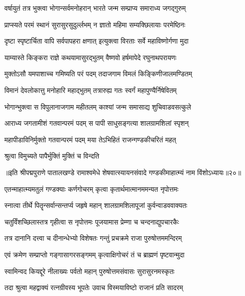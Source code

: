 \twolineshloka
{वर्षायुतं तत्र भुक्त्वा भोगान्सर्वमनोहरान्}
{भारते जन्म सम्प्राप्य समाराध्य जगद्गुरुम्}%

\twolineshloka
{प्राप्स्यते परमं स्थानं सुरासुरसुदुर्ल्लभम्}
{न ज्ञातो महिमा सम्यक्छिलायाः परमेष्ठिनः}%

\twolineshloka
{दृष्टा स्पृष्टार्चिता वापि सर्वपापहरा क्षणात्}
{इत्युक्त्वा विरताः सर्वे महाविष्णोर्गणा मुदा}%

\twolineshloka
{याम्यास्ते किङ्करा राज्ञे कथयामासुरद्भुतम्}
{वैष्णवो हर्षमापेदे रघुनाथपरायणः}%

\twolineshloka
{मुक्तोऽसौ यमपाशाच्च गमिष्यति परं पदम्}
{तदाजगाम विमलं किङ्किणीजालमण्डितम्}%

\twolineshloka
{विमानं देवलोकात्तु मनोहारि महाद्भुतम्}
{तत्रारुह्य गतः स्वर्गं महापुण्यैर्निषेवितम्}%

\twolineshloka
{भोगान्भुक्त्वा स विपुलानाजगाम महीतलम्}
{काश्यां जन्म समासाद्य शुचिवाडवसत्कुले}%

\twolineshloka
{आराध्य जगतामीशं गतवान्परमं पदम्}
{स पापी साधुसङ्गत्या शालग्रामशिलां स्पृशन्}%

\twolineshloka
{महापीडाविनिर्मुक्तो गतवान्परमं पदम्}
{मया तेऽभिहितं राजन्गण्डकीचरितं महत्}%

\onelineshloka
{श्रुत्वा विमुच्यते पापैर्भुक्तिं मुक्तिं च विन्दति}%

{॥इति श्रीपद्मपुराणे पातालखण्डे रामाश्वमेधे शेषवात्स्यायनसंवादे गण्डकीमाहात्म्यं नाम विंशोऽध्यायः॥२०॥}



\twolineshloka
{एतन्माहात्म्यमतुलं गण्डक्याः कर्णगोचरम्}
{कृत्वा कृतार्थमात्मानममन्यत नृपोत्तमः}%

\twolineshloka
{स्नात्वा तीर्थे पितॄन्सर्वान्सन्तर्प्य जहृषे महान्}
{शालग्रामशिलापूजां कुर्वन्वाडववाक्यतः}%

\twolineshloka
{चतुर्विंशच्छिलास्तत्र गृहीत्वा स नृपोत्तमः}
{पूजयामास प्रेम्णा च चन्दनाद्युपचारकैः}%

\twolineshloka
{तत्र दानानि दत्त्वा च दीनान्धेभ्यो विशेषतः}
{गन्तुं प्रचक्रमे राजा पुरुषोत्तममन्दिरम्}%

\twolineshloka
{एवं क्रमेण सम्प्राप्तो गङ्गासागरसङ्गमम्}
{कृत्वाक्षिगोचरं तं च ब्राह्मणं पृष्टवान्मुदा}%

\twolineshloka
{स्वामिन्वद कियद्दूरे नीलाख्यः पर्वतो महान्}
{पुरुषोत्तमसंवासः सुरासुरनमस्कृतः}%

\twolineshloka
{तदा श्रुत्वा महद्वाक्यं रत्नग्रीवस्य भूपतेः}
{उवाच विस्मयाविष्टो राजानं प्रति सादरम्}%

